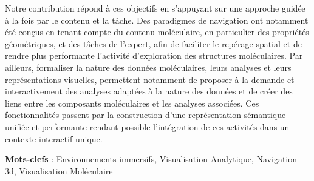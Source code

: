 Notre contribution répond à ces objectifs en s’appuyant sur une approche guidée à la fois par le contenu et la tâche. Des paradigmes de navigation ont notamment été conçus en tenant compte du contenu moléculaire, en particulier des propriétés géométriques, et des tâches de l’expert, afin de faciliter le repérage spatial et de rendre plus performante l’activité d’exploration des structures moléculaires. Par ailleurs, formaliser la nature des données moléculaires, leurs analyses et leurs représentations visuelles, permettent notamment de proposer à la demande et interactivement des analyses adaptées à la nature des données et de créer des liens entre les composants moléculaires et les analyses associées. Ces fonctionnalités passent par la construction d’une représentation sémantique unifiée et performante rendant possible l’intégration de ces activités dans un contexte interactif unique.


\textbf{Mots-clefs} : Environnements immersifs, Visualisation Analytique, Navigation 3d, Visualisation Moléculaire


